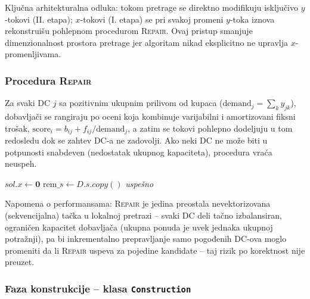\documentclass[12pt,a4paper]{article}
\begin{document}
Ključna arhitekturalna odluka: tokom pretrage se direktno modifikuju
isključivo $y$-tokovi (II. etapa); $x$-tokovi (I. etapa) se pri svakoj
promeni $y$-toka iznova rekonstruišu pohlepnom procedurom \textsc{Repair}.
Ovaj pristup smanjuje dimenzionalnost prostora pretrage jer algoritam
nikad eksplicitno ne upravlja $x$-promenljivama.

\subsubsection{Procedura \textsc{Repair}}

Za svaki DC $j$ sa pozitivnim ukupnim prilivom od kupaca ($\text{demand}_j
= \sum_k y_{jk}$), dobavljači se rangiraju po oceni koja kombinuje
varijabilni i amortizovani fiksni trošak,
$\text{score}_i = b_{ij} + f_{ij}/\text{demand}_j$, a zatim se tokovi
pohlepno dodeljuju u tom redosledu dok se zahtev DC-a ne zadovolji.
Ako neki DC ne može biti u potpunosti snabdeven (nedostatak ukupnog
kapaciteta), procedura vraća neuspeh.

\begin{algorithm}[H]
\caption{Repair$(sol, D)$}
\SetAlgoLined
$sol.x \leftarrow \mathbf{0}$\;
$\text{rem}\_s \leftarrow D.s.copy()$\;
\Return \textit{uspešno}
\end{algorithm}

Napomena o performansama: \textsc{Repair} je jedina preostala nevektorizovana
(sekvencijalna) tačka u lokalnoj pretrazi -- svaki DC deli tačno izbalansiran,
ograničen kapacitet dobavljača (ukupna ponuda je uvek jednaka ukupnoj
potražnji), pa bi inkrementalno prepravljanje samo pogođenih DC-ova moglo
promeniti da li \textsc{Repair} uspeva za pojedine kandidate -- taj rizik po
korektnost nije preuzet.

\subsubsection{Faza konstrukcije -- klasa \texttt{Construction}}
\end{document}
